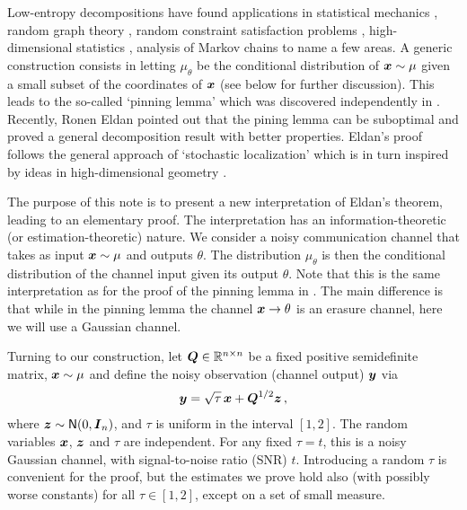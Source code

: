 \documentclass[11pt]{article}
\numberwithin{equation}{section}
\theoremstyle{myremark}
\theoremstyle{myremark}
\theoremstyle{myexample}
\newcommand{\R}{\mathbb{R}}
\newcommand{\1}{\mathbf{1}}
\begin{document}
Low-entropy decompositions have found applications in statistical mechanics \cite{coja2019bethe,austin2019structure},
random graph theory \cite{chatterjee2016nonlinear,eldan2018gaussian},  
random constraint satisfaction problems \cite{ayre2020satisfiability}, 
high-dimensional statistics \cite{coja2018information}, analysis of Markov chains \cite{eldan2021spectral} to name a few areas. A generic construction consists in letting 
$\mu_\theta$ be the conditional distribution of ${\boldsymbol{x}}\sim\mu$ given a small subset of 
the coordinates of ${\boldsymbol{x}}$ (see below for further discussion). 
This leads to the so-called `pinning lemma' which was 
discovered independently in \cite{MontanariSparse,raghavendra2012approximating}. Recently,
 Ronen Eldan \cite{eldan2020taming} pointed out that 
the pining lemma can be suboptimal and proved a general decomposition result with 
better properties. Eldan's proof follows the general approach of `stochastic localization'
which is in turn inspired by ideas in high-dimensional geometry \cite{eldan2016skorokhod}.

The purpose of this note is to present a new interpretation of Eldan's theorem,
leading to an elementary proof. The interpretation has an information-theoretic
(or estimation-theoretic) nature. We consider a noisy communication
channel that takes as input ${\boldsymbol{x}}\sim \mu$ and outputs $\theta$. The distribution
$\mu_{\theta}$ is then the conditional distribution of the channel input given its 
output $\theta$. Note that this is the same interpretation as for the proof of the pinning lemma
in \cite{MontanariSparse}. The main difference is that while in the pinning lemma the channel 
${\boldsymbol{x}}\to\theta$ is an erasure channel, here we will use a Gaussian channel.

Turning to our construction,  let $\bQ\in \R^{n \times n}$ be a fixed positive
semidefinite matrix,
${\boldsymbol{x}} \sim \mu$ and define the noisy observation (channel output) ${\boldsymbol{y}}$
via
%
\begin{align}
{\boldsymbol{y}} = \sqrt{\tau} \, {\boldsymbol{x}} + {\boldsymbol{Q}}^{1/2}{\boldsymbol{z}}\, ,\label{eq:GaussianChannel}
\end{align} 
%
where  ${\boldsymbol{z}} \sim {\sf N}(0,{\boldsymbol{I}}_n)$, and $\tau$ is uniform in the interval $[1,2]$. 
The random variables ${\boldsymbol{x}}$, ${\boldsymbol{z}}$ and $\tau$ are independent. 
For any fixed $\tau=t$, this is a noisy Gaussian channel, with signal-to-noise
ratio (SNR) $t$. Introducing a random $\tau$ is convenient for the proof, 
but the estimates we prove hold also (with possibly worse constants)
for all $\tau\in[1,2]$, except on a set of small measure. 
\end{document}

